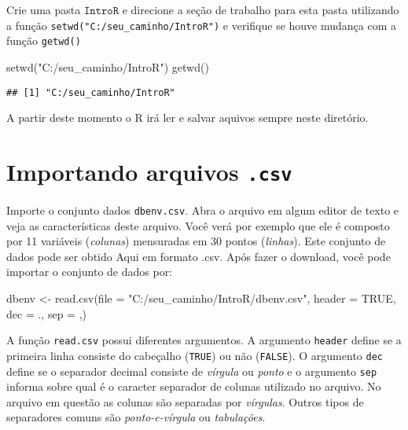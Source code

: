 \documentclass[
]{book}
\newenvironment{Shaded}{\begin{snugshade}}{\end{snugshade}}
\newcommand{\AttributeTok}[1]{\textcolor[rgb]{0.77,0.63,0.00}{#1}}
\newcommand{\ConstantTok}[1]{\textcolor[rgb]{0.00,0.00,0.00}{#1}}
\newcommand{\FunctionTok}[1]{\textcolor[rgb]{0.00,0.00,0.00}{#1}}
\newcommand{\NormalTok}[1]{#1}
\newcommand{\OtherTok}[1]{\textcolor[rgb]{0.56,0.35,0.01}{#1}}
\newcommand{\StringTok}[1]{\textcolor[rgb]{0.31,0.60,0.02}{#1}}
\begin{document}
Crie uma pasta \(\texttt{IntroR}\) e direcione a seção de trabalho para esta pasta utilizando a função \texttt{setwd("C:/seu\_caminho/IntroR")} e verifique se houve mudança com a função \texttt{getwd()}

\begin{Shaded}
\begin{Highlighting}[]
\FunctionTok{setwd}\NormalTok{(}\StringTok{"C:/seu\_caminho/IntroR"}\NormalTok{)}
\FunctionTok{getwd}\NormalTok{()}
\end{Highlighting}
\end{Shaded}

\begin{verbatim}
## [1] "C:/seu_caminho/IntroR"
\end{verbatim}

A partir deste momento o R irá ler e salvar aquivos sempre neste diretório.

\hypertarget{importando-arquivos-.csv}{%
\section{\texorpdfstring{Importando arquivos \texttt{.csv}}{Importando arquivos .csv}}\label{importando-arquivos-.csv}}

Importe o conjunto dados \texttt{dbenv.csv}. Abra o arquivo em algum editor de texto e veja as características deste arquivo. Você verá por exemplo que ele é composto por 11 variáveis (\emph{colunas}) mensuradas em 30 pontos (\emph{linhas}). Este conjunto de dados pode ser obtido Aqui em formato .csv. Após fazer o download, você pode importar o conjunto de dados por:

\begin{Shaded}
\begin{Highlighting}[]
\NormalTok{dbenv }\OtherTok{\textless{}{-}} \FunctionTok{read.csv}\NormalTok{(}\AttributeTok{file =} \StringTok{"C:/seu\_caminho/IntroR/dbenv.csv"}\NormalTok{, }
                 \AttributeTok{header =} \ConstantTok{TRUE}\NormalTok{, }\AttributeTok{dec =} \StringTok{\textquotesingle{}.\textquotesingle{}}\NormalTok{, }\AttributeTok{sep =} \StringTok{\textquotesingle{},\textquotesingle{}}\NormalTok{)}
\end{Highlighting}
\end{Shaded}

A função \texttt{read.csv} possui diferentes argumentos. A argumento \texttt{header} define se a primeira linha consiste do cabeçalho (\texttt{TRUE}) ou não (\texttt{FALSE}). O argumento \texttt{dec} define se o separador decimal consiste de \emph{vírgula} ou \emph{ponto} e o argumento \texttt{sep} informa sobre qual é o caracter separador de colunas utilizado no arquivo. No arquivo em questão as colunas são separadas por \emph{vírgulas}. Outros tipos de separadores comuns são \emph{ponto-e-vírgula} ou \emph{tabulações}.
\end{document}
